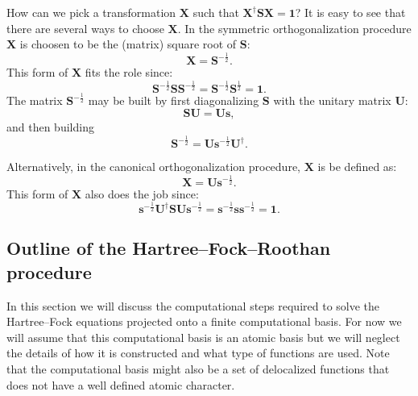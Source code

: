 \documentclass[../Main/chem532-notes.tex]{subfiles}
\begin{document}
How can we pick a transformation $\mathbf{X}$ such that $\mathbf{X}^\dagger \mathbf{SX} = \mathbf{1}$? It is easy to see that there are several ways to choose $\mathbf{X}$.
In the symmetric orthogonalization procedure $\mathbf{X}$ is choosen to be the (matrix) square root of $\mathbf{S}$:
\begin{equation}
\mathbf{X} = \mathbf{S}^{-\frac{1}{2}}.
\end{equation}
This form of $\mathbf{X}$ fits the role since:
\begin{equation}
\mathbf{S}^{-\frac{1}{2}} \mathbf{S} \mathbf{S}^{-\frac{1}{2}} = \mathbf{S}^{-\frac{1}{2}}\mathbf{S}^{\frac{1}{2}}= \mathbf{1}.
\end{equation}
The matrix $\mathbf{S}^{-\frac{1}{2}}$ may be built by first diagonalizing $\mathbf{S}$ with the unitary matrix $\mathbf{U}$:
\begin{equation}
\mathbf{SU} = \mathbf{Us},
\end{equation}
and then building
\begin{equation}
\mathbf{S}^{-\frac{1}{2}} = \mathbf{U} \mathbf{s}^{-\frac{1}{2}}\mathbf{U}^\dagger.
\end{equation}

Alternatively, in the canonical orthogonalization procedure, $\mathbf{X}$ is be defined as:
\begin{equation}
\mathbf{X} = \mathbf{U} \mathbf{s}^{-\frac{1}{2}}.
\end{equation}
This form of $\mathbf{X}$ also does the job since: 
\begin{equation}
\mathbf{s}^{-\frac{1}{2}} \mathbf{U}^\dagger \mathbf{S} \mathbf{U} \mathbf{s}^{-\frac{1}{2}} = \mathbf{s}^{-\frac{1}{2}} \mathbf{s} \mathbf{s}^{-\frac{1}{2}} = \mathbf{1}.
\end{equation}

\subsection{Outline of the Hartree--Fock--Roothan procedure}

In this section we will discuss the computational steps required to solve the Hartree--Fock equations projected onto a finite computational basis.
For now we will assume that this computational basis is an atomic basis but we will neglect the details of how it is constructed and what type of functions are used. Note that the computational basis might also be a set of delocalized functions that does not have a well defined atomic character.
\end{document}
